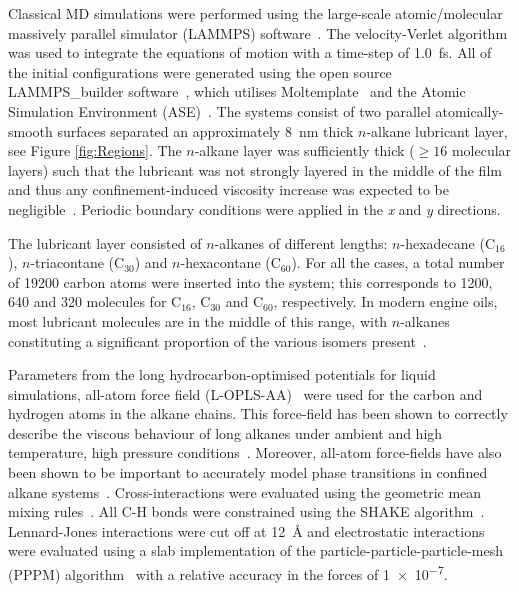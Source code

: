 \documentclass[5p]{elsarticle}
\begin{document}
Classical MD simulations were performed using the large-scale atomic/molecular massively parallel simulator (LAMMPS) software~\cite{Plimpton1995}. The velocity-Verlet algorithm was used to integrate the equations of motion with a time-step of \SI{1.0}{\femto\second}. All of the initial configurations were generated using the open source LAMMPS\_builder software~\cite{Ewen2017b,Ewen2017}, which utilises Moltemplate~\cite{Jewett2013} and the Atomic Simulation Environment (ASE)~\cite{HjorthLarsen2017}. The systems consist of two parallel atomically-smooth surfaces separated an approximately \SI{8}{\nano\meter} thick $n$-alkane lubricant layer, see Figure \ref{fig:Regions}. The $n$-alkane layer was sufficiently thick ($\geq 16$ molecular layers) such that the lubricant was not strongly layered in the middle of the film and thus any confinement-induced viscosity increase was expected to be negligible~\cite{Gee1990}. Periodic boundary conditions were applied in the \emph{x} and \emph{y} directions.

The lubricant layer consisted of $n$-alkanes of different lengths: $n$-hexadecane (C$_{16}$), $n$-triacontane (C$_{30}$) and $n$-hexacontane (C$_{60}$). For all the cases, a  total number of 19200 carbon atoms were inserted into the system; this corresponds to 1200, 640 and 320 molecules for C$_{16}$, C$_{30}$ and C$_{60}$, respectively. In modern engine oils, most lubricant molecules are in the middle of this range, with $n$-alkanes constituting a significant proportion of the various isomers present~\cite{Liang2018}.

Parameters from the long hydrocarbon-optimised potentials for liquid simulations, all-atom force field (L-OPLS-AA)~\cite{Jorgensen1996,Siu2012} were used for the carbon and hydrogen atoms in the alkane chains. This force-field has been shown to correctly describe the viscous behaviour of long alkanes under ambient and high temperature, high pressure conditions~\cite{Ewen2016a}. Moreover, all-atom force-fields have also been shown to be important to accurately model phase transitions in confined alkane systems~\cite{Docherty2010}. Cross-interactions were evaluated using the geometric mean mixing rules~\cite{Jorgensen1996}. All C-H bonds were constrained using the SHAKE algorithm~\cite{Ryckaert1977}. Lennard-Jones interactions were cut off at \SI{12}{\angstrom} and electrostatic interactions were evaluated using a slab implementation of the particle-particle-particle-mesh (PPPM) algorithm~\cite{Yeh1999} with a relative accuracy in the forces of \SI{1e-7}{}.
\end{document}

